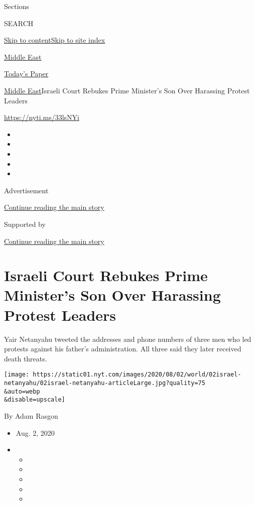 Sections

SEARCH

\protect\hyperlink{site-content}{Skip to
content}\protect\hyperlink{site-index}{Skip to site index}

\href{https://www.nytimes.com/section/world/middleeast}{Middle East}

\href{https://myaccount.nytimes.com/auth/login?response_type=cookie\&client_id=vi}{}

\href{https://www.nytimes.com/section/todayspaper}{Today's Paper}

\href{/section/world/middleeast}{Middle East}\textbar{}Israeli Court
Rebukes Prime Minister's Son Over Harassing Protest Leaders

\url{https://nyti.ms/33lsNYi}

\begin{itemize}
\item
\item
\item
\item
\item
\end{itemize}

Advertisement

\protect\hyperlink{after-top}{Continue reading the main story}

Supported by

\protect\hyperlink{after-sponsor}{Continue reading the main story}

\hypertarget{israeli-court-rebukes-prime-ministers-son-over-harassing-protest-leaders}{%
\section{Israeli Court Rebukes Prime Minister's Son Over Harassing
Protest
Leaders}\label{israeli-court-rebukes-prime-ministers-son-over-harassing-protest-leaders}}

Yair Netanyahu tweeted the addresses and phone numbers of three men who
led protests against his father's administration. All three said they
later received death threats.

\texttt{[image: https://static01.nyt.com/images/2020/08/02/world/02israel-netanyahu/02israel-netanyahu-articleLarge.jpg?quality=75\\\&auto=webp\\\&disable=upscale]}

By Adam Rasgon

\begin{itemize}
\item
  Aug. 2, 2020
\item
  \begin{itemize}
  \item
  \item
  \item
  \item
  \item
  \end{itemize}
\end{itemize}

